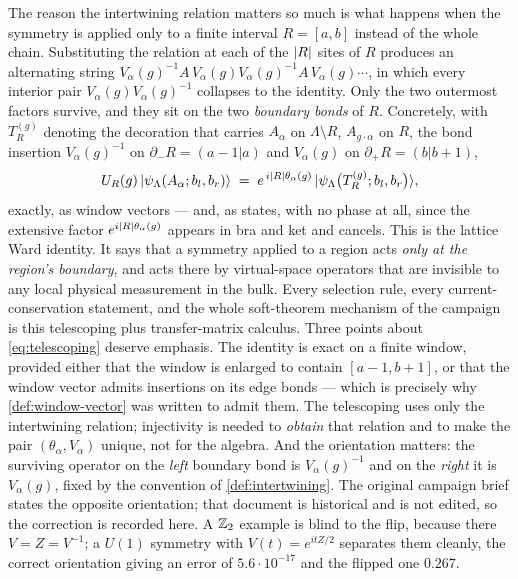 The reason the intertwining relation matters so much is what happens when the
symmetry is applied only to a finite interval $R = [a,b]$ instead of the whole
chain. Substituting the relation at each of the $\lvert R\rvert$ sites of $R$ produces
an alternating string
$V_{\alpha}(g)^{-1} A \, V_{\alpha}(g) V_{\alpha}(g)^{-1} A \, V_{\alpha}(g)
 \cdots$, in which every interior pair
$V_{\alpha}(g) V_{\alpha}(g)^{-1}$ collapses to the identity. Only the two
outermost factors survive, and they sit on the two \emph{boundary bonds} of
$R$. Concretely, with $T_{R}^{(g)}$ denoting the decoration that carries
$A_{\alpha}$ on $\Lambda \setminus R$, $A_{g \cdot \alpha}$ on $R$, the bond
insertion $V_{\alpha}(g)^{-1}$ on $\partial_{-}R = (a-1|a)$ and
$V_{\alpha}(g)$ on $\partial_{+}R = (b|b+1)$,
\begin{equation}
  U_{R}(g) \, |\psi_{\Lambda}(A_{\alpha}; b_{l}, b_{r})\rangle
  \;=\; e^{\,i \lvert R\rvert \theta_{\alpha}(g)} \,
        |\psi_{\Lambda}\bigl(T_{R}^{(g)}; b_{l}, b_{r}\bigr)\rangle ,
  \label{eq:telescoping}
\end{equation}
exactly, as window vectors --- and, as states, with no phase at all, since the
extensive factor $e^{i\lvert R\rvert\theta_{\alpha}(g)}$ appears in bra and ket and
cancels. This is the lattice Ward identity. It says that a symmetry applied
to a region acts \emph{only at the region's boundary}, and acts there by
virtual-space operators that are invisible to any local physical measurement in
the bulk. Every selection rule, every current-conservation statement, and the
whole soft-theorem mechanism of the campaign is this telescoping plus
transfer-matrix calculus. Three points about \eqref{eq:telescoping} deserve
emphasis. The identity is exact on a finite window, provided either that the
window is enlarged to contain $[a-1,b+1]$, or that the window vector admits
insertions on its edge bonds --- which is precisely why
\cref{def:window-vector} was written to admit them. The telescoping uses only
the intertwining relation; injectivity is needed to \emph{obtain} that relation
and to make the pair $(\theta_{\alpha}, V_{\alpha})$ unique, not for the
algebra. And the orientation matters: the surviving operator on the
\emph{left} boundary bond is $V_{\alpha}(g)^{-1}$ and on the \emph{right} it is
$V_{\alpha}(g)$, fixed by the convention of \cref{def:intertwining}. The
original campaign brief states the opposite orientation; that document is
historical and is not edited, so the correction is recorded here. A
$\mathbb{Z}_{2}$ example is blind to the flip, because there $V = Z = V^{-1}$; a
$U(1)$ symmetry with $V(t) = e^{itZ/2}$ separates them cleanly, the correct
orientation giving an error of $5.6 \cdot 10^{-17}$ and the flipped one
$0.267$.

